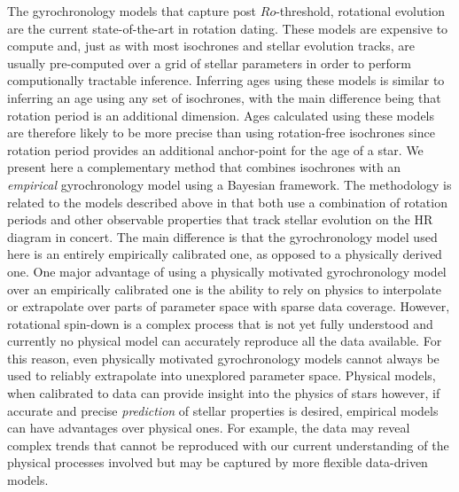 The gyrochronology models that capture post $Ro$-threshold, rotational
evolution \citep{vansaders2016} are the current state-of-the-art in rotation
dating.
These models are expensive to compute and, just as with most isochrones and
stellar evolution tracks, are usually pre-computed over a grid of stellar
parameters in order to perform computionally tractable inference.
Inferring ages using these models is similar to inferring an age using any set
of isochrones, with the main difference being that rotation period is an
additional dimension.
Ages calculated using these models are therefore likely to be more precise
than using rotation-free isochrones since rotation period provides an
additional anchor-point for the age of a star.
We present here a complementary method that combines isochrones with an {\it
empirical} gyrochronology model using a Bayesian framework.
The methodology is related to the models described above \citep{vansaders2016}
in that both use a combination of rotation periods and other observable
properties that track stellar evolution on the HR diagram in concert.
The main difference is that the gyrochronology model used here is an entirely
empirically calibrated one, as opposed to a physically derived one.
One major advantage of using a physically motivated gyrochronology model over
an empirically calibrated one is the ability to rely on physics to interpolate
or extrapolate over parts of parameter space with sparse data coverage.
However, rotational spin-down is a complex process that is not yet fully
understood and currently no physical model can accurately reproduce all the
data available.
For this reason, even physically motivated gyrochronology models cannot always
be used to reliably extrapolate into unexplored parameter space.
Physical models, when calibrated to data can provide insight into the physics
of stars however, if accurate and precise {\it prediction} of stellar
properties is desired, empirical models can have advantages over physical
ones.
For example, the data may reveal complex trends that cannot be reproduced with
our current understanding of the physical processes involved but may be
captured by more flexible data-driven models.
